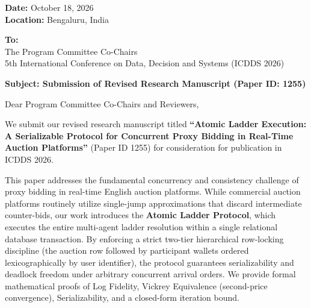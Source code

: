 \documentclass[11pt]{article}
\begin{document}
\begin{flushright}
    \textbf{Date:} October 18, 2026 \\
    \textbf{Location:} Bengaluru, India
\end{flushright}

\vspace{0.5em}

\begin{flushleft}
    \textbf{To:} \\
    The Program Committee Co-Chairs \\
    5th International Conference on Data, Decision and Systems (ICDDS 2026) \\
\end{flushleft}

\vspace{0.8em}

\noindent \textbf{Subject: Submission of Revised Research Manuscript (Paper ID: 1255)}

\vspace{0.8em}

\noindent Dear Program Committee Co-Chairs and Reviewers,

\vspace{0.5em}

\noindent We submit our revised research manuscript titled \textbf{``Atomic Ladder Execution: A Serializable Protocol for Concurrent Proxy Bidding in Real-Time Auction Platforms''} (Paper ID 1255) for consideration for publication in ICDDS 2026.

\vspace{0.5em}

\noindent This paper addresses the fundamental concurrency and consistency challenge of proxy bidding in real-time English auction platforms. While commercial auction platforms routinely utilize single-jump approximations that discard intermediate counter-bids, our work introduces the \textbf{Atomic Ladder Protocol}, which executes the entire multi-agent ladder resolution within a single relational database transaction. By enforcing a strict two-tier hierarchical row-locking discipline (the auction row followed by participant wallets ordered lexicographically by user identifier), the protocol guarantees serializability and deadlock freedom under arbitrary concurrent arrival orders. We provide formal mathematical proofs of Log Fidelity, Vickrey Equivalence (second-price convergence), Serializability, and a closed-form iteration bound.

\vspace{0.5em}
\end{document}
